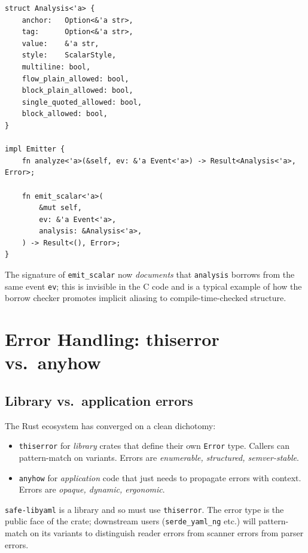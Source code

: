 \documentclass[12pt]{article}
\theoremstyle{definition}
\theoremstyle{remark}
\begin{document}
\begin{lstlisting}
struct Analysis<'a> {
    anchor:   Option<&'a str>,
    tag:      Option<&'a str>,
    value:    &'a str,
    style:    ScalarStyle,
    multiline: bool,
    flow_plain_allowed: bool,
    block_plain_allowed: bool,
    single_quoted_allowed: bool,
    block_allowed: bool,
}

impl Emitter {
    fn analyze<'a>(&self, ev: &'a Event<'a>) -> Result<Analysis<'a>, Error>;

    fn emit_scalar<'a>(
        &mut self,
        ev: &'a Event<'a>,
        analysis: &Analysis<'a>,
    ) -> Result<(), Error>;
}
\end{lstlisting}

The signature of \texttt{emit\_scalar} now \emph{documents} that
\texttt{analysis} borrows from the same event \texttt{ev}; this is invisible
in the C code and is a typical example of how the borrow checker promotes
implicit aliasing to compile-time-checked structure.

\section{Error Handling: thiserror vs.\ anyhow}
\label{sec:errors}

\subsection{Library vs.\ application errors}

The Rust ecosystem has converged on a clean dichotomy:

\begin{itemize}[leftmargin=2em]
\item \texttt{thiserror} for \emph{library} crates that define their own
\texttt{Error} type. Callers can pattern-match on variants. Errors are
\emph{enumerable, structured, semver-stable}.
\item \texttt{anyhow} for \emph{application} code that just needs to propagate
errors with context. Errors are \emph{opaque, dynamic, ergonomic}.
\end{itemize}

\texttt{safe-libyaml} is a library and so must use \texttt{thiserror}.
The error type is the public face of the crate; downstream users
(\texttt{serde\_yaml\_ng} etc.) will pattern-match on its variants to
distinguish reader errors from scanner errors from parser errors.
\end{document}
